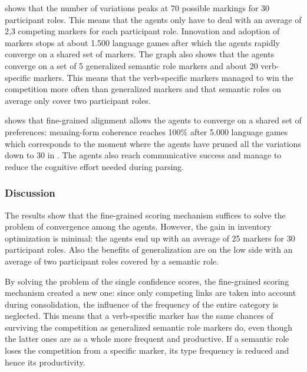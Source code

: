  shows that the number of variations peaks at 70 possible markings for 30 participant roles. This means that the agents only have to deal with an average of 2,3 competing markers for each participant role. Innovation and adoption of markers stops at about 1.500 language games after which the agents rapidly converge on a shared set of markers. The graph also shows that the agents converge on a set of 5 generalized semantic role markers and about 20 verb-specific markers. This means that the verb-specific markers managed to win the competition more often than generalized markers and that semantic roles on average only cover two participant roles.

 shows that fine-grained alignment allows the agents to converge on a shared set of preferences: meaning-form coherence reaches 100\% after 5.000 language games which corresponds to the moment where the agents have pruned all the variations down to 30 in . The agents also reach communicative success and manage to reduce the cognitive effort needed during parsing.


\subsubsection{Discussion}
 The results show that the fine-grained scoring mechanism suffices to solve the problem of convergence among the agents. However, the gain in inventory optimization is minimal: the agents end up with an average of 25 markers for 30 participant roles. Also the benefits of generalization are on the low side with an average of two participant roles covered by a semantic role.

By solving the problem of the single confidence scores, the fine-grained scoring mechanism created a new one: since only competing links are taken into account during consolidation, the influence of the frequency of the entire category is neglected. This means that a verb-specific marker has the same chances of surviving the competition as generalized semantic role markers do, even though the latter ones are as a whole more frequent and productive. If a semantic role loses the competition from a specific marker, its type frequency is reduced and hence its productivity.

